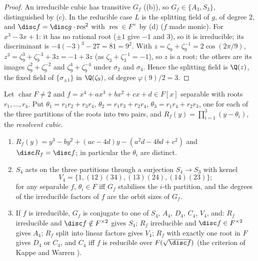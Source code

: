\begin{proof}
An irreducible cubic has transitive $G_f$ ((b)), so $G_f\in\{A_3,S_3\}$, distinguished by (c). In the
reducible case $L$ is the splitting field of $g$, of degree $2$, and $\disc f=\disc g\cdot\operatorname{res}^2$ with $\operatorname{res}\in F^\times$ by
(d) ($f$ made monic). For $x^3-3x+1$: it has no rational root ($\pm1$ give $-1$ and $3$), so it is irreducible; its discriminant is
$-4(-3)^3-27=81=9^2$. With $z=\zeta_9+\zeta_9^{-1}=2\cos(2\pi/9)$, $z^3=\zeta_9^3+\zeta_9^{-3}+3z=-1+3z$ (as $\zeta_3+\zeta_3^{-1}=-1$), so $z$ is a root; the others are its
images $\zeta_9^2+\zeta_9^{-2}$ and $\zeta_9^4+\zeta_9^{-4}$ under $\sigma_2$ and $\sigma_4$. Hence the splitting field is $\Q(z)$, the fixed field of $\{\sigma_{\pm1}\}$ in
$\Q(\zeta_9)$, of degree $\varphi(9)/2=3$.
\end{proof}

\begin{proposition}[Quartics]\label{prop:galois:quartic}
Let $\operatorname{char}F\ne2$ and $f=x^4+ax^3+bx^2+cx+d\in F[x]$ separable with roots $r_1,\dots,r_4$. Put $\theta_1=r_1r_2+r_3r_4$, $\theta_2=r_1r_3+r_2r_4$,
$\theta_3=r_1r_4+r_2r_3$, one for each of the three partitions of the roots into two pairs, and $R_f(y)=\prod_{i=1}^3(y-\theta_i)$, the \emph{resolvent cubic}.
\begin{enumerate}[label=(\alph*)]
\item $R_f(y)=y^3-by^2+(ac-4d)y-(a^2d-4bd+c^2)$ and $\disc R_f=\disc f$; in particular the $\theta_i$ are distinct.
\item $S_4$ acts on the three partitions through a surjection $S_4\to S_3$ with kernel
\[
V_4=\{1,(12)(34),(13)(24),(14)(23)\};
\]
for any separable $f$,
$\theta_i\in F$ iff $G_f$ stabilises the $i$-th partition, and the degrees of the irreducible factors of $f$ are the orbit sizes of $G_f$.
\item If $f$ is irreducible, $G_f$ is conjugate to one of $S_4$, $A_4$, $D_4$, $C_4$, $V_4$, and: $R_f$ irreducible and $\disc f\notin F^{\times2}$ gives $S_4$;
$R_f$ irreducible and $\disc f\in F^{\times2}$ gives $A_4$; $R_f$ split into linear factors gives $V_4$; $R_f$ with exactly one root in $F$ gives $D_4$ or $C_4$, and
$C_4$ iff $f$ is reducible over $F(\sqrt{\disc f})$ (the criterion of Kappe and Warren \cite{KappeWarren89}).
\end{enumerate}
\end{proposition}


